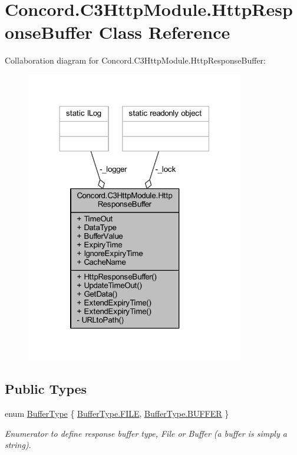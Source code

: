 \hypertarget{class_concord_1_1_c3_http_module_1_1_http_response_buffer}{}\section{Concord.\+C3\+Http\+Module.\+Http\+Response\+Buffer Class Reference}
\label{class_concord_1_1_c3_http_module_1_1_http_response_buffer}


Collaboration diagram for Concord.\+C3\+Http\+Module.\+Http\+Response\+Buffer\+:
\nopagebreak
\begin{figure}[H]
\begin{center}
\leavevmode
\includegraphics[width=270pt]{class_concord_1_1_c3_http_module_1_1_http_response_buffer__coll__graph}
\end{center}
\end{figure}
\subsection*{Public Types}
\begin{DoxyCompactItemize}
\item 
enum \mbox{\hyperlink{class_concord_1_1_c3_http_module_1_1_http_response_buffer_a34a310395d4f4472b24cf6da3fc3ab82}{Buffer\+Type}} \{ \mbox{\hyperlink{class_concord_1_1_c3_http_module_1_1_http_response_buffer_a34a310395d4f4472b24cf6da3fc3ab82a9fc5887c030f7a3e19821ebec457e719}{Buffer\+Type.\+F\+I\+LE}}, 
\mbox{\hyperlink{class_concord_1_1_c3_http_module_1_1_http_response_buffer_a34a310395d4f4472b24cf6da3fc3ab82a17de626bcae5109bb2f7a66dfc4a8a1d}{Buffer\+Type.\+B\+U\+F\+F\+ER}}
 \}
\begin{DoxyCompactList}\small\item\em Enumerator to define response buffer type, File or Buffer (a buffer is simply a string). \end{DoxyCompactList}\end{DoxyCompactItemize}
